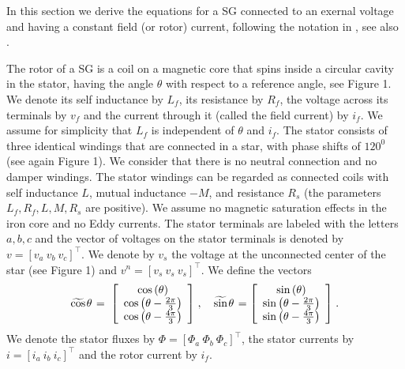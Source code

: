 \documentclass[letterpaper,10pt,conference]{ieeeconf}
\newcommand{\m}      {{\hbox{\hskip 1pt}}}
\begin{document}
In this section we derive the equations for a SG connected to an
exernal voltage and having a constant field (or rotor) current,
following the notation in \cite{ZhWe:11}, see also \cite{NaWe:15}.

The rotor of a SG is a coil on a magnetic core that spins
inside a circular cavity in the stator, having the angle $\theta$ with
respect to a reference angle, see Figure 1. We denote its self
inductance by $L_f$, its resistance by $R_f$, the voltage across its
terminals by $v_f$ and the current through it (called the field
current) by $i_f$. We assume for simplicity that $L_f$ is independent
of $\theta$ and $i_f$. The stator consists of three identical windings
that are connected in a star, with phase shifts of $120^0$ (see again
Figure 1). We consider that there is no neutral connection and no
damper windings. The stator windings can be regarded as connected
coils with self inductance $L$, mutual inductance $-M$, and resistance
$R_s$ (the parameters $L_f,R_f,L,M,R_s$ are positive). We assume no
magnetic saturation effects in the iron core and no Eddy currents. The
stator terminals are labeled with the letters $a,b,c$ and the vector
of voltages on the stator terminals is denoted by $v=\left[v_a\ v_b\
v_c\right]^\top$. We denote by $v_s$ the voltage at the unconnected 
center of the star (see Figure 1) and $v^n=[v_s\ v_s\ v_s]^\top$.
We define the vectors
$$ \widetilde{\cos}\m\theta \m=\m \left[\begin{array}{c} \cos\left(
   \theta\right)\\ \cos\left(\theta-\frac{2\pi}{3}\right)\\
   \cos\left(\theta-\frac{4\pi}{3}\right) \end{array}\right] \m,\quad
   \widetilde{\sin}\m\theta \m= \left[\begin{array}{c} \sin\left(
   \theta\right)\\ \sin\left(\theta-\frac{2\pi}{3}\right)\\ \sin\left
   (\theta-\frac{4\pi}{3}\right) \end{array}\right] \m.$$
We denote the stator fluxes by $\Phi=\left[\Phi_a\ \Phi_b\ \Phi_c
\right]^\top$, the stator currents by $i=\left[i_a\ i_b\ i_c\right]
^\top$ and the rotor current by $i_f$. 
\end{document}

